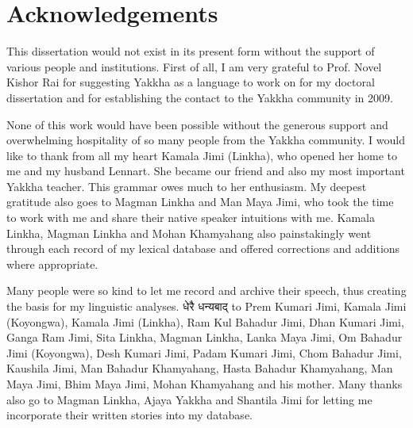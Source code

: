 ﻿%





\chapter*{Acknowledgements}

This dissertation would not exist in its present form without the support of various people and institutions. First of all, I am very grateful to Prof. Novel Kishor Rai for suggesting Yakkha as a language to work on for my doctoral dissertation and for establishing the contact to the Yakkha community in 2009.

None of this work would have been possible without the generous support and overwhelming hospitality of so many people from the Yakkha community. I would like to thank from all my heart Kamala  Jimi (Linkha), who opened her home to me and my husband Lennart. She became our friend and also my most important Yakkha teacher. This grammar owes much to her enthusiasm. My deepest gratitude also goes to Magman Linkha and Man Maya Jimi, who took the time to work with me and share their native speaker intuitions with me. Kamala Linkha, Magman Linkha and Mohan Khamyahang also painstakingly went through each record of my lexical database and offered corrections and additions where appropriate.

Many people were so kind to let me record and archive their speech, thus creating the basis for my linguistic analyses. {\Deva धेरै धन्यबाद्} to Prem Kumari Jimi, Kamala Jimi (Koyongwa), Kamala Jimi (Linkha), Ram Kul Bahadur Jimi, Dhan Kumari Jimi, Ganga Ram Jimi, Sita Linkha, Magman Linkha, Lanka Maya Jimi, Om Bahadur Jimi (Koyongwa), Desh Kumari Jimi, Padam Kumari Jimi, Chom Bahadur Jimi, Kaushila Jimi, Man Bahadur Khamyahang, Hasta Bahadur Khamyahang, Man Maya  Jimi, Bhim Maya  Jimi, Mohan Khamyahang and his mother. Many thanks also go to Magman Linkha, Ajaya Yakkha and Shantila Jimi for letting me incorporate their written stories into my database.   
 
